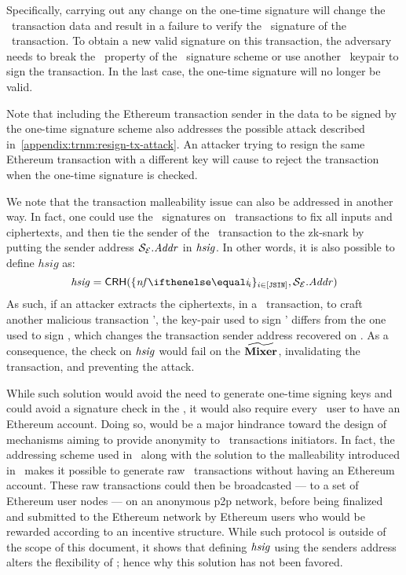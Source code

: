 Specifically, carrying out any change on the one-time signature will change the \ethereum~transaction data and result in a failure to verify the \ecdsa~signature of the \ethereum~transaction. To obtain a new valid signature on this transaction, the adversary needs to break the \ufcma~property of the \ecdsa~signature scheme or use another \ecdsa~keypair to sign the transaction. In the last case, the one-time signature will no longer be valid.

Note that including the Ethereum transaction sender in the data to be signed by the one-time signature scheme also addresses the possible attack described in~\cref{appendix:trnm:resign-tx-attack}. An attacker trying to resign the same Ethereum transaction with a different key will cause \mixer{} to reject the transaction when the one-time signature is checked.

\begin{remark}
    We note that the transaction malleability issue can also be addressed in another way. In fact, one could use the \ecdsa~signatures on \ethereum~transactions to fix all inputs and ciphertexts, and then tie the sender of the \ethereum~transaction to the zk-snark by putting the sender address $\mathcal{{S}_{E}}.\mathit{Addr}$ in $\mathit{hsig}$. In other words, it is also possible to define $hsig$ as:
    \[
        \hsig = \crh(\indexedset{\nf{i}}{i \in [\jsin]}, \eparty{S}.\addr)
    \]
    As such, if an attacker extracts the ciphertexts, in a \zethTx~transaction, to craft another malicious transaction \zethTx', the key-pair used to sign \zethTx' differs from the one used to sign \zethTx, which changes the transaction sender address recovered on \mixer. As a consequence, the check on $\mathit{hsig}$ would fail on the $\widetilde{\mathbf{Mixer}}$, invalidating the transaction, and preventing the attack.

    While such solution would avoid the need to generate one-time signing keys and could avoid a signature check in the \mixer, it would also require every \zeth~user to have an Ethereum account. Doing so, would be a major hindrance toward the design of mechanisms aiming to provide anonymity to \zeth~transactions initiators. In fact, the addressing scheme used in \zeth~along with the solution to the malleability introduced in \zcash~makes it possible to generate raw \zeth~transactions without having an Ethereum account. These raw transactions could then be broadcasted --- to a set of Ethereum user nodes --- on an anonymous p2p network, before being finalized and submitted to the Ethereum network by Ethereum users who would be rewarded according to an incentive structure. While such protocol is outside of the scope of this document, it shows that defining $\mathit{hsig}$ using the senders address alters the flexibility of \zeth; hence why this solution has not been favored.
\end{remark}
